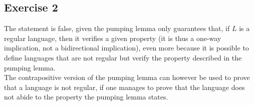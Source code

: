 {\subsection{Exercise 2}
The statement is false, given the pumping lemma only guarantees that, if $L$ is a regular language, then it verifies a given property (it is thus a one-way implication, not a bidirectional implication), even more because it is possible to define languages that are not regular but verify the property described in the pumping lemma.\\
The contrapositive version of the pumping lemma can however be used to prove that a language is not regular, if one manages to prove that the language does not abide to the property the pumping lemma states.
}
